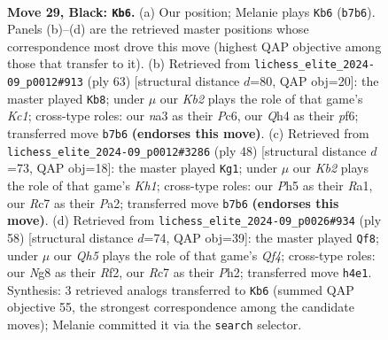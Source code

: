 \documentclass[11pt]{article}
\begin{document}
\clearpage

\begin{figure}[p]\centering
\begin{subfigure}{0.46\textwidth}\centering
\resizebox{\linewidth}{!}{%
\newchessgame
\chessboard[
  setfen={4Q1nr/1kr3p1/8/2p3Pp/5P1q/N1P5/PP4K1/R1B5 b - - 1 29},
  showmover=false,
  pgfstyle=straightmove, color=movearrow, markmove={b7-b6}
]}
\caption{}
\end{subfigure}\hfill
\begin{subfigure}{0.46\textwidth}\centering
\resizebox{\linewidth}{!}{%
\newchessgame
\chessboard[
  setfen={2k1r3/ppp4p/2p2P2/6P1/8/1P1qn2Q/P6P/6RK b - - 0 32},
  showmover=false,
  pgfstyle=straightmove, color=movearrow, markmove={c8-b8}
]}
\caption{}
\end{subfigure}
\\[4pt]
\begin{subfigure}{0.46\textwidth}\centering
\resizebox{\linewidth}{!}{%
\newchessgame
\chessboard[
  setfen={r3k3/p4p1p/4p2Q/2ppP3/8/2P2q2/PP3P1P/R4R1K w q - 7 25},
  showmover=false,
  pgfstyle=straightmove, color=movearrow, markmove={h1-g1}
]}
\caption{}
\end{subfigure}\hfill
\begin{subfigure}{0.46\textwidth}\centering
\resizebox{\linewidth}{!}{%
\newchessgame
\chessboard[
  setfen={r1bR4/1p4pk/p3p2p/2q1n3/5Q2/8/2P2RPP/6K1 w - - 6 30},
  showmover=false,
  pgfstyle=straightmove, color=movearrow, markmove={f4-f8}
]}
\caption{}
\end{subfigure}
\caption{\textbf{Move 29, Black: \texttt{Kb6}.} (a) Our position; Melanie plays \texttt{Kb6} (\texttt{b7b6}). Panels (b)--(d) are the retrieved master positions whose correspondence most drove this move (highest QAP objective among those that transfer to it). (b) Retrieved from \texttt{lichess\_elite\_2024-09\_p0012\#913} (ply 63) [structural distance $d$=80, QAP obj=20]: the master played \texttt{Kb8}; under $\mu$ our \emph{Kb2} plays the role of that game's \emph{Kc1}; cross-type roles: our \emph{n}a3 as their \emph{P}c6, our \emph{Q}h4 as their \emph{p}f6; transferred move \texttt{b7b6} \textbf{(endorses this move)}. (c) Retrieved from \texttt{lichess\_elite\_2024-09\_p0012\#3286} (ply 48) [structural distance $d$=73, QAP obj=18]: the master played \texttt{Kg1}; under $\mu$ our \emph{Kb2} plays the role of that game's \emph{Kh1}; cross-type roles: our \emph{P}h5 as their \emph{R}a1, our \emph{R}c7 as their \emph{P}a2; transferred move \texttt{b7b6} \textbf{(endorses this move)}. (d) Retrieved from \texttt{lichess\_elite\_2024-09\_p0026\#934} (ply 58) [structural distance $d$=74, QAP obj=39]: the master played \texttt{Qf8}; under $\mu$ our \emph{Qh5} plays the role of that game's \emph{Qf4}; cross-type roles: our \emph{N}g8 as their \emph{R}f2, our \emph{R}c7 as their \emph{P}h2; transferred move \texttt{h4e1}. Synthesis: 3 retrieved analogs transferred to \texttt{Kb6} (summed QAP objective 55, the strongest correspondence among the candidate moves); Melanie committed it via the \texttt{search} selector.}
\label{fig:thought-m57}
\end{figure}
\end{document}
